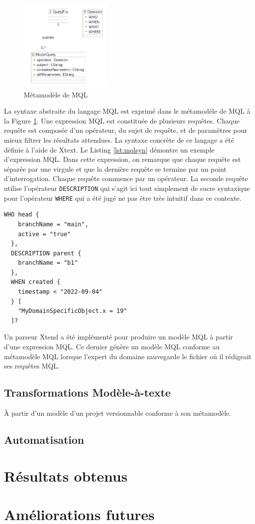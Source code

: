 \documentclass[12pt, titlepage]{article}
\begin{document}
\begin{figure}[ht!]
  \centering
  \includegraphics[width=0.4\textwidth]{mqlmm.png}
  \caption{Métamodèle de MQL}
  \label{fig:mqlmm}
\end{figure}

La syntaxe abstraite du langage MQL est exprimé dans le métamodèle de MQL à la
Figure \ref{fig:mqlmm}. Une expression MQL est constituée de plusieurs requêtes.
Chaque requête est composée d'un opérateur, du sujet de requête, et de
paramètres pour mieux filtrer les résultats attendues. La syntaxe concrète de ce
langage a été définie à l'aide de Xtext. Le Listing \ref{lst:mqlsyn} démontre un
exemple d'expression MQL. Dans cette expression, on remarque que chaque requête
est séparée par une virgule et que la dernière requête se termine par un point
d'interrogation. Chaque requête commence par un opérateur. La seconde requête
utilise l'opérateur \texttt{DESCRIPTION} qui s'agit ici tout simplement de sucre
syntaxique pour l'opérateur \texttt{WHERE} qui a été jugé ne pas être très
intuitif dans ce contexte.

\begin{lstlisting}[style=mql, label=lst:mqlsyn, caption=Expression MQL]
  WHO head {
    branchName = "main",
    active = "true"
  },
  DESCRIPTION parent {
    branchName = "b1"
  },
  WHEN created {
    timestamp < "2022-09-04"
  } [
    "MyDomainSpecificObject.x = 19"
  ]?
\end{lstlisting}

Un parseur Xtend a été implémenté pour produire un modèle MQL à partir d'une
expression MQL. Ce dernier génère un modèle MQL conforme au métamodèle MQL
lorsque l'expert du domaine sauvegarde le fichier où il rédigeait ses requêtes
MQL.

\subsection*{Transformations Modèle-à-texte}

À partir d'un modèle d'un projet versionnable conforme à son métamodèle.

\subsection*{Automatisation}

\section*{Résultats obtenus}

\section*{Améliorations futures}

 

\end{document}
